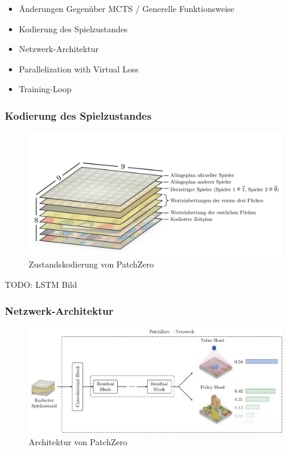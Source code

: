\begin{itemize}
    \item Änderungen Gegenüber MCTS / Generelle Funktionsweise
    \item Kodierung des Spielzustandes
    \item Netzwerk-Architektur
    \item Parallelization with Virtual Loss
    \item Training-Loop
\end{itemize}

\subsubsection*{Kodierung des Spielzustandes}

\begin{figure}[!ht]
    \centering
    \vspace*{-1.75cm}
    \includegraphics[width=\textwidth]{res/pictures/patch-zero-state.pdf}
    \caption{Zustandskodierung von PatchZero}
    \label{fig:patch-zero-state}
\end{figure}

TODO: LSTM Bild

\pagebreak

\subsubsection*{Netzwerk-Architektur}

\cite{2018.Lc0AlphaZero}
\cite{2019.SqueezeandExcitation}
\cite{2020.Lc0NetworkTopology}

\begin{figure}[!ht]
    \centering
    \includegraphics[width=\textwidth]{res/pictures/patch-zero-architecture.pdf}
    \caption{Architektur von PatchZero}
    \label{fig:patch-zero-architecture}
\end{figure}

